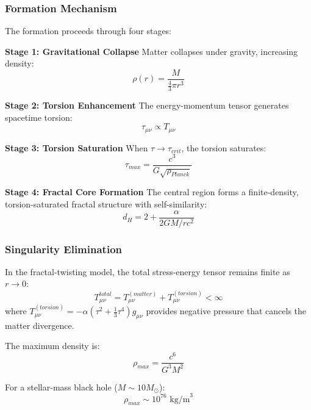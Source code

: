 \subsubsection{Formation Mechanism}

The formation proceeds through four stages:

\textbf{Stage 1: Gravitational Collapse}
Matter collapses under gravity, increasing density:
\begin{equation}
    \rho(r) = \frac{M}{\frac{4}{3}\pi r^3}
\end{equation}

\textbf{Stage 2: Torsion Enhancement}
The energy-momentum tensor generates spacetime torsion:
\begin{equation}
    \tau_{\mu\nu} \propto T_{\mu\nu}
\end{equation}

\textbf{Stage 3: Torsion Saturation}
When $\tau \to \tau_{crit}$, the torsion saturates:
\begin{equation}
    \tau_{max} = \frac{c^3}{G\sqrt{\rho_{Planck}}}
\end{equation}

\textbf{Stage 4: Fractal Core Formation}
The central region forms a finite-density, torsion-saturated fractal structure with self-similarity:
\begin{equation}
    d_H = 2 + \frac{\alpha}{2GM/rc^2}
\end{equation}

\subsubsection{Singularity Elimination}

\begin{theorem}
In the fractal-twisting model, the total stress-energy tensor remains finite as $r \to 0$:
\begin{equation}
    T^{total}_{\mu\nu} = T^{(matter)}_{\mu\nu} + T^{(torsion)}_{\mu\nu} < \infty
\end{equation}
where $T^{(torsion)}_{\mu\nu} = -\alpha(\tau^2 + \frac{1}{3}\tau^4)g_{\mu\nu}$ provides negative pressure that cancels the matter divergence.
\end{theorem}

The maximum density is:
\begin{equation}
    \rho_{max} = \frac{c^6}{G^3M^2}
\end{equation}

For a stellar-mass black hole ($M \sim 10M_\odot$):
\begin{equation}
    \rho_{max} \sim 10^{76} \text{ kg/m}^3
\end{equation}

